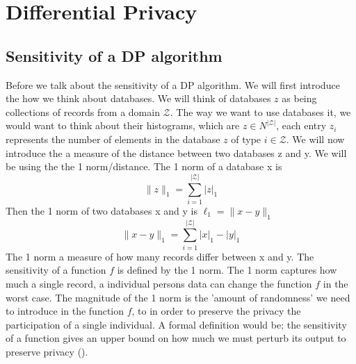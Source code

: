\documentclass[11pt]{article}
\theoremstyle{definition}
\begin{document}
\section{Differential Privacy}


\subsection{Sensitivity of a DP algorithm}
Before we talk about the sensitivity of a DP algorithm. We will first introduce the how we think about databases.
We will think of databases $z$ as being collections of records from a domain $\mathcal{Z}$. The way we want to use databases it, we would want to think about their histograms, which are $z\in N^{|\mathcal{Z}|} $, each entry $z_i$ represents the number of elements in the database $z$ of type $i\in \mathcal{Z}$. We will now introduce the a measure of the distance between two databases z and y. We will be using the the 1 norm/distance. The 1 norm of a database x is 
\[\lVert z \rVert_1 = \sum_{i=1}^{|\mathcal{Z}|} | z |_1\]
Then the 1 norm of two databases x and y is $\ell_1 = \lVert x-y \rVert_1$
\[\lVert x-y \rVert_1 = \sum_{i=1}^{|\mathcal{Z}|} | x |_1-| y |_1\]
The 1 norm a measure of how many records differ between x and y. The sensitivity of a function $f$ is defined by the 1 norm. The 1 norm captures how much a single record, a individual persons data can change the function $f$ in the worst case. The magnitude of the 1 norm is the 'amount of randomness' we need to introduce in the function $f$, to in order to preserve the privacy the participation of a single individual. A formal definition would be; the sensitivity of a function gives an upper bound on how much we must perturb its output to preserve privacy (\cite[17]{algo_fun}).

\end{document}
